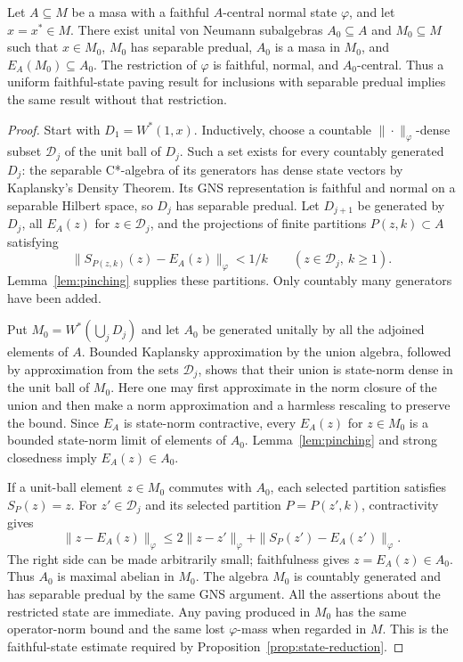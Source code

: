 \begin{lemma}\label{lem:separable-reduction}
Let $A\subseteq M$ be a masa with a faithful $A$-central normal state
$\varphi$, and let $x=x^*\in M$.  There exist unital von Neumann
subalgebras $A_0\subseteq A$ and $M_0\subseteq M$ such that $x\in M_0$,
$M_0$ has separable predual, $A_0$ is a masa in $M_0$, and
$E_A(M_0)\subseteq A_0$.  The restriction of $\varphi$ is faithful,
normal, and $A_0$-central.  Thus a uniform faithful-state paving result
for inclusions with separable predual implies the same result without
that restriction.
\end{lemma}

\begin{proof}
Start with $D_1=W^*(1,x)$.  Inductively, choose a countable
$\|\cdot\|_\varphi$-dense subset $\mathcal D_j$ of the unit ball of
$D_j$.  Such a set exists for every countably generated $D_j$: the
separable C*-algebra of its generators has dense state vectors by
Kaplansky's Density Theorem.  Its GNS representation is faithful and
normal on a separable Hilbert space, so $D_j$ has separable predual.
Let $D_{j+1}$ be generated by $D_j$, all $E_A(z)$ for
$z\in\mathcal D_j$, and the projections of finite partitions
$P(z,k)\subset A$ satisfying
\[
 \|S_{P(z,k)}(z)-E_A(z)\|_\varphi<1/k
 \qquad(z\in\mathcal D_j,\ k\geq1).
\]
Lemma~\ref{lem:pinching} supplies these partitions.  Only countably
many generators have been added.

Put $M_0=W^*(\bigcup_jD_j)$ and let $A_0$ be generated unitally by all
the adjoined elements of $A$.  Bounded Kaplansky approximation by the
union algebra, followed by approximation from the sets $\mathcal D_j$,
shows that their union is state-norm dense in the unit ball of $M_0$.
Here one may first approximate in the norm closure of the union and
then make a norm approximation and a harmless rescaling to preserve
the bound.  Since $E_A$ is state-norm contractive, every $E_A(z)$ for
$z\in M_0$ is a bounded state-norm limit of elements of $A_0$.
Lemma~\ref{lem:pinching} and strong closedness imply $E_A(z)\in A_0$.

If a unit-ball element $z\in M_0$ commutes with $A_0$, each selected
partition satisfies $S_P(z)=z$.  For $z'\in\mathcal D_j$ and its
selected partition $P=P(z',k)$, contractivity gives
\[
 \|z-E_A(z)\|_\varphi
 \leq 2\|z-z'\|_\varphi
       +\|S_P(z')-E_A(z')\|_\varphi.
\]
The right side can be made arbitrarily small; faithfulness gives
$z=E_A(z)\in A_0$.  Thus $A_0$ is maximal abelian in $M_0$.
The algebra $M_0$ is countably generated and has separable predual by
the same GNS argument.  All the assertions about the restricted state
are immediate. Any paving produced in $M_0$ has the same operator-norm
bound and the same lost $\varphi$-mass when regarded in $M$. This is the
faithful-state estimate required by Proposition~\ref{prop:state-reduction}.
\end{proof}

